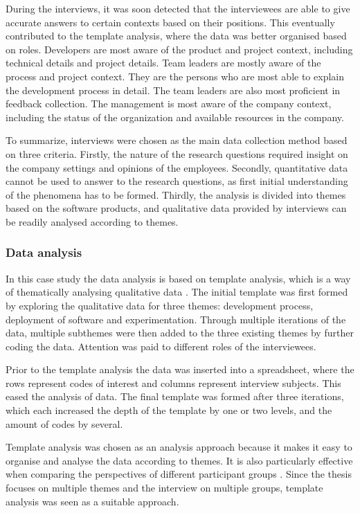 \documentclass[english]{tktltiki2}
\theoremstyle{definition}
\theoremstyle{remark}
\begin{document}
During the interviews, it was soon detected that the interviewees are able to give accurate answers to certain contexts based on their positions. This eventually contributed to the template analysis, where the data was better organised based on roles. Developers are most aware of the product and project context, including technical details and project details. Team leaders are mostly aware of the process and project context. They are the persons who are most able to explain the development process in detail. The team leaders are also most proficient in feedback collection. The management is most aware of the company context, including the status of the organization and available resources in the company. 

To summarize, interviews were chosen as the main data collection method based on three criteria. Firstly, the nature of the research questions required insight on the company settings and opinions of the employees. Secondly, quantitative data cannot be used to answer to the research questions, as first initial understanding of the phenomena has to be formed. Thirdly, the analysis is divided into themes based on the software products, and qualitative data provided by interviews can be readily analysed according to themes.

\subsubsection{Data analysis} %
In this case study the data analysis is based on template analysis, which is a way of thematically analysing qualitative data \cite{king1998template}. The initial template was first formed by exploring the qualitative data for three themes: development process, deployment of software and experimentation. Through multiple iterations of the data, multiple subthemes were then added to the three existing themes by further coding the data. Attention was paid to different roles of the interviewees.

Prior to the template analysis the data was inserted into a spreadsheet, where the rows represent codes of interest and columns represent interview subjects. This eased the analysis of data. The final template was formed after three iterations, which each increased the depth of the template by one or two levels, and the amount of codes by several.  

Template analysis was chosen as an analysis approach because it makes it easy to organise and analyse the data according to themes. It is also particularly effective when comparing the perspectives of different participant groups \cite{king2004using}. Since the thesis focuses on multiple themes and the interview on multiple groups, template analysis was seen as a suitable approach.   
\end{document}

